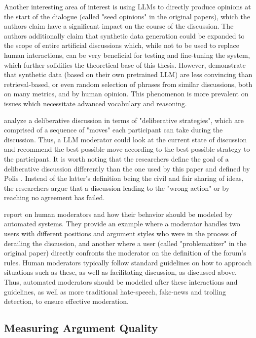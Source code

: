 Another interesting area of interest is using LLMs to directly produce opinions at the start of the dialogue (called "seed opinions" in the original papers), which the authors claim have a significant impact on the course of the discussion. The authors additionally claim that synthetic data generation could be expanded to the scope of entire artificial discussions which, while not to be used to replace human interactions, can be very beneficial for testing and fine-tuning the system, which further solidifies the theoretical base of this thesis. However, \cite{karadzhov2023delidata} demonstrate that synthetic data (based on their own pretrained LLM) are less convincing than retrieval-based, or even random selection of phrases from similar discussions, both on many metrics, and by human opinion. This phenomenon is more prevalent on issues which necessitate advanced vocabulary and reasoning.

\cite{al-khatib-etal-2018-modeling} analyze a deliberative discussion in terms of "deliberative strategies", which are comprised of a sequence of "moves" each participant can take during the discussion. Thus, a LLM moderator could look at the current state of discussion and recommend the best possible move according to the best possible strategy to the participant. It is worth noting that the researchers define the goal of a deliberative discussion differently than the one used by this paper and defined by Polis \cite{small-polis-llm}. Instead of the latter's definition being the civil and fair sharing of ideas, the researchers argue that a discussion leading to the "wrong action" or by reaching no agreement has failed.

\cite{vecchi-2021-towards} report on human moderators and how their behavior should be modeled by automated systems. They provide an example where a moderator handles two users with different positions and argument styles who were in the process of derailing the discussion, and another where a user (called "problematizer" in the original paper) directly confronts the moderator on the definition of the forum's rules. Human moderators typically follow standard guidelines on how to approach situations such as these, as well as facilitating discussion, as discussed above. Thus, automated moderators should be modelled after these interactions and guidelines, as well as more traditional hate-speech, fake-news and trolling detection, to ensure effective moderation. 


\subsection{Measuring Argument Quality}
\label{sec:related:measures}

